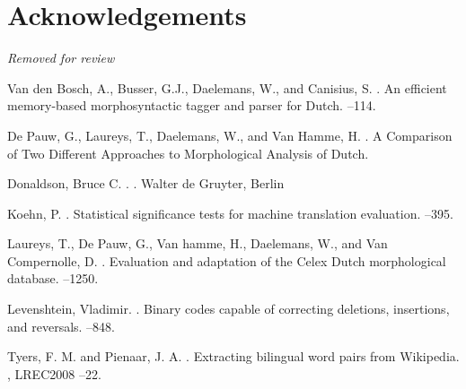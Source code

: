 \documentclass[11pt]{article}
\newcommand{\confname}{EAMT 2011}
\begin{document}
\section*{Acknowledgements}
\emph{Removed for review}

% 

\begin{thebibliography}{}

Van den Bosch, A., Busser, G.J., Daelemans, W., and Canisius, S.
. 
\newblock An efficient memory-based morphosyntactic tagger and parser for Dutch.
--114.

De Pauw, G., Laureys, T., Daelemans, W., and Van Hamme, H.
. 
\newblock A Comparison of Two Different Approaches to Morphological Analysis of Dutch.

Donaldson, Bruce C.
.
.
\newblock Walter de Gruyter, Berlin

Koehn, P.
. 
\newblock Statistical significance tests for machine translation evaluation.
--395.

Laureys, T., De Pauw, G., Van hamme, H., Daelemans, W., and Van Compernolle, D.
. 
\newblock Evaluation and adaptation of the Celex Dutch morphological database.
--1250.

Levenshtein, Vladimir.
. 
\newblock Binary codes capable of correcting deletions, insertions, and reversals.
--848.

Tyers, F. M. and Pienaar, J. A.
. 
\newblock Extracting bilingual word pairs from Wikipedia.
, LREC2008
--22. 


\end{thebibliography}
\end{document}
